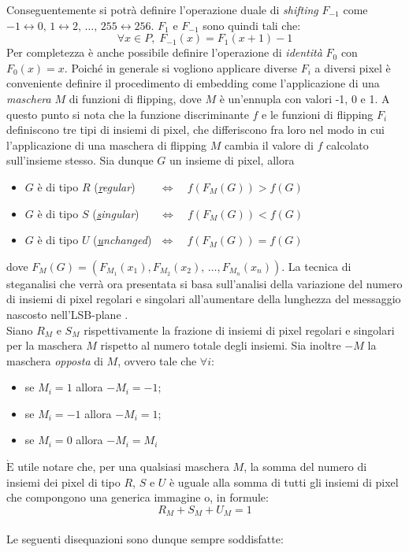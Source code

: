 Conseguentemente si potrà definire l'operazione duale di \textit{shifting} $F_{-1}$ come $-1\leftrightarrow 0,\, 1 \leftrightarrow 2,\, \dots,\, 255\leftrightarrow 256$. $F_1$ e $F_{-1}$ sono quindi tali che:
\begin{equation}
\label{1}
\forall x\in P, \; F_{-1}(x) = F_1 (x+1) -1
\end{equation} 
Per completezza è anche possibile definire l'operazione di \textit{identità} $F_0$ con $F_0 (x) = x$. Poiché in generale si vogliono applicare diverse $F_i$ a diversi pixel è conveniente definire il procedimento di embedding come l'applicazione di una \textit{maschera} $M$ di funzioni di flipping, dove $M$ è un'ennupla con valori -1, 0 e 1. A questo punto si nota che la funzione discriminante $f$ e le funzioni di flipping $F_i$ definiscono tre tipi di insiemi di pixel, che differiscono fra loro nel modo in cui l'applicazione di una maschera di flipping $M$ cambia il valore di $f$ calcolato sull'insieme stesso.
Sia dunque $G$ un insieme di pixel, allora
\begin{itemize}
\item[] $G$ è di tipo $R$ (\textit{\underline{r}egular}) $ \quad \; \; \;  \Leftrightarrow \quad f(F_M(G)) > f(G)$
\item[] $G$ è di tipo $S$ (\textit{\underline{s}ingular}) $\, \, \, \, \;  \; \; \Leftrightarrow \quad f(F_M(G)) < f(G)$
\item[] $G$ è di tipo $U$ (\textit{\underline{u}nchanged}) $\, \,\Leftrightarrow \quad f(F_M(G)) = f(G)$
\end{itemize}   
dove $F_M(G) = (F_{M_1}(x_1), F_{M_2}(x_2), \, \dots, F_{M_n}(x_n))$. La tecnica di steganalisi che verrà ora presentata si basa sull'analisi della variazione del numero di insiemi di pixel regolari e singolari all'aumentare della lunghezza del messaggio nascosto nell'LSB-plane \cite{fried2}.\\Siano $R_M$ e $S_M$ rispettivamente la frazione di insiemi di pixel regolari e singolari per la maschera $M$ rispetto al numero totale degli insiemi. Sia inoltre $-M$ la maschera \textit{opposta} di $M$, ovvero tale che $\forall i$:
\begin{itemize}
\item se $M_i = 1$ allora $-M_i = -1$;
\item se $M_i = -1$ allora $-M_i = 1$;
\item se $M_i = 0$ allora $-M_i = M_i$
\end{itemize} 
$\mathrm{\grave{E}}$ utile notare che, per una qualsiasi maschera $M$, la somma del numero di insiemi dei pixel di tipo $R$, $S$ e $U$ è uguale alla somma di tutti gli insiemi di pixel che compongono una generica immagine o, in formule: \[R_M + S_M + U_M = 1\]\\Le seguenti disequazioni sono dunque sempre soddisfatte:
